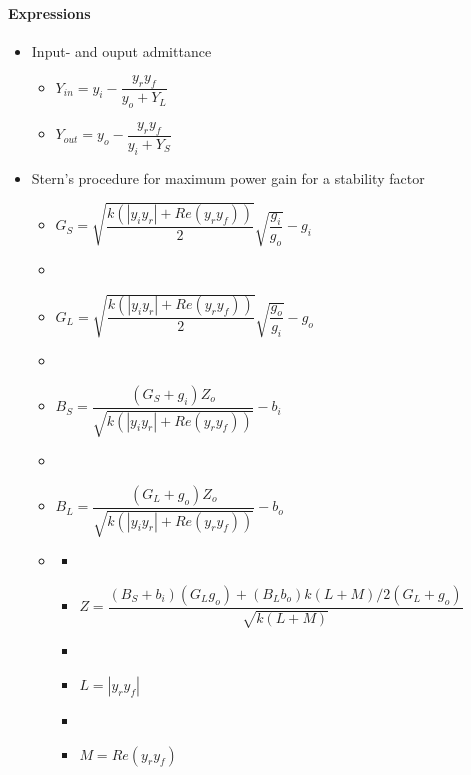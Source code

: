 \paragraph{Expressions}
\begin{itemize}
	\item Input- and ouput admittance
	\begin{itemize}
		\item $Y_{in}=y_i-\dfrac{y_ry_f}{y_o+Y_L}$
		\item $Y_{out}=y_o-\dfrac{y_ry_f}{y_i+Y_S}$
	\end{itemize}
	\item Stern's procedure for maximum power gain for a stability factor
	\begin{itemize}
		\item $G_S=\sqrt{\dfrac{k(|y_iy_r|+Re(y_ry_f))}{2}}\sqrt{\dfrac{g_i}{g_o}}-g_i$
		\item[]
		\item $G_L=\sqrt{\dfrac{k(|y_iy_r|+Re(y_ry_f))}{2}}\sqrt{\dfrac{g_o}{g_i}}-g_o$
		\item[]
		\item $B_S=\dfrac{(G_S+g_i)Z_o}{\sqrt{k(|y_iy_r|+Re(y_ry_f))}}-b_i$
		\item[]
		\item $B_L=\dfrac{(G_L+g_o)Z_o}{\sqrt{k(|y_iy_r|+Re(y_ry_f))}}-b_o$
		\item[]
		\begin{itemize}
			\item[]
			\item $Z=\dfrac{(B_S+b_i)(G_Lg_o)+(B_Lb_o)k(L+M)/2(G_L+g_o)}{\sqrt{k(L+M)}}$
			\item[]
			\item $L = |y_ry_f|$
			\item[] 
			\item $M = Re(y_ry_f)$
		\end{itemize}
	\end{itemize}
\end{itemize}